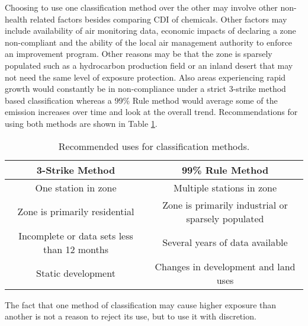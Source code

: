 Choosing to use one classification method over the other may involve other non-health related factors besides comparing CDI of chemicals. Other factors may include availability of air monitoring data, economic impacts of declaring a zone non-compliant and the ability of the local air management authority to enforce an improvement program. Other reasons may be that the zone is sparsely populated such as a hydrocarbon production field or an inland desert that may not need the same level of exposure protection. Also areas experiencing rapid growth would constantly be in non-compliance under a strict 3-strike method based classification whereas a 99\% Rule method would average some of the emission increases over time and look at the overall trend. Recommendations for using both methods are shown in Table \ref{tb18:recommmends}.

% 
\begin{table}[!htb]
\centering
\caption{Recommended uses for classification methods.}
\label{tb18:recommmends}
\begin{adjustbox}{width=1\textwidth}
\begin{tabular}{@{}cc@{}}
\toprule
\textbf{3-Strike Method} & \textbf{99\% Rule Method} \\ \midrule
One station in zone & Multiple stations in zone \\
Zone is primarily residential & Zone is primarily industrial or sparsely populated \\
Incomplete or data sets less than 12 months & Several years of data available \\
Static development & Changes in development and land uses \\ \bottomrule
\end{tabular}
\end{adjustbox}
\end{table}

The fact that one method of classification may cause higher exposure than another is not a reason to reject its use, but to use it with discretion. 






